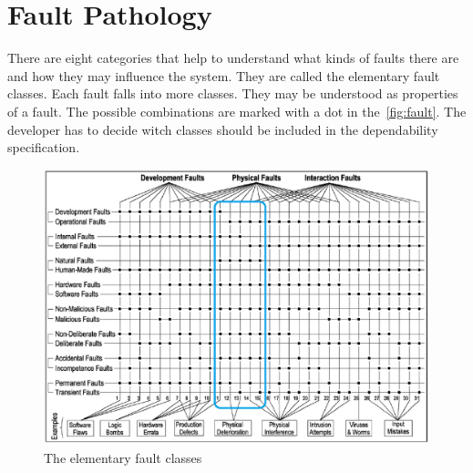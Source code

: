 \section{Fault Pathology}
There are eight categories that help to understand what kinds of faults there are and how they may influence the system. They are called the elementary fault classes. Each fault falls into more classes. They may be understood as properties of a fault. The possible combinations are marked with a dot in the~\autoref{fig:fault}. The developer has to decide witch classes should be included in the dependability specification.

\begin{figure}[H]
\centering
\includegraphics[width=\textwidth]{figures/fault_classes.png}
\caption{The elementary fault classes~\cite{art:Avizienis}}
\label{fig:fault}
\end{figure}

